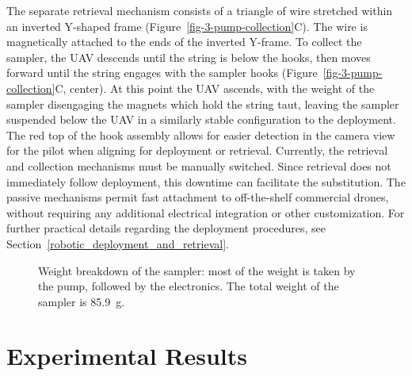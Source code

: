 The separate retrieval mechanism consists of a triangle of wire stretched within an inverted Y-shaped frame (Figure~\ref{fig-3-pump-collection}C). The wire is magnetically attached to the ends of the inverted Y-frame. To collect the sampler, the UAV descends until the string is below the hooks, then moves forward until the string engages with the sampler hooks (Figure~\ref{fig-3-pump-collection}C, center). At this point the UAV ascends, with the weight of the sampler disengaging the magnets which hold the string taut, leaving the sampler suspended below the UAV in a similarly stable configuration to the deployment. The red top of the hook assembly allows for easier detection in the camera view for the pilot when aligning for deployment or retrieval. Currently, the retrieval and collection mechanisms must be manually switched. Since retrieval does not immediately follow deployment, this downtime can facilitate the substitution. The passive mechanisms permit fast attachment to off-the-shelf commercial drones, without requiring any additional electrical integration or other customization. For further practical details regarding the deployment procedures, see Section~\ref{robotic_deployment_and_retrieval}.

\begin{figure}[!t]
\centering

\caption{Weight breakdown of the sampler: most of the weight is taken by the pump, followed by the electronics. The total weight of the sampler is 85.9~g.}
\label{sampler-weight-breakdown}
\end{figure}

\section{Experimental Results}

